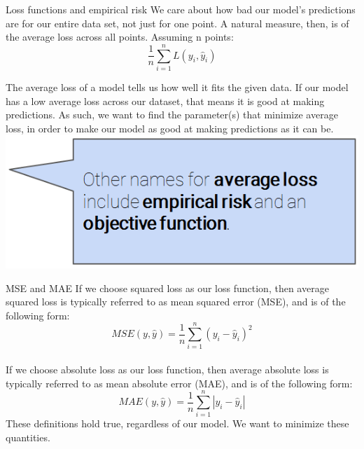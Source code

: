 \documentclass[aspectratio=169]{../latex_main/tntbeamer}  %
\begin{document}
	
	\begin{frame}{Loss functions and empirical risk}
	    We care about how bad our model’s predictions are for our entire data set, not just for one point. A natural measure, then, is of the average loss across all points.  Assuming   n   points:\\
	    \begin{equation*}
	        \frac{1}{n}\sum\limits_{i=1}^nL(y_i, \hat{y}_i)
	    \end{equation*}
	    
	    \bigskip
	    The average loss of a model tells us how well it fits the given data. If our model has a low average loss across our dataset, that means it is good at making predictions. As such, we want to find the parameter(s) that minimize average loss, in order to make our model as good at making predictions as it can be.\\
	    
        \vspace{-3.5cm}
        \hspace{8.5cm}
        \includegraphics[scale=.3]{Bild22}
	    
	\end{frame}
	
	
	\begin{frame}{MSE and MAE}
	    If we choose squared loss as our loss function, then average squared loss is typically referred to as mean squared error (MSE), and is of the following form: 
	    \begin{equation*}
	        MSE(y, \hat{y}) = \frac{1}{n}\sum\limits_{i=1}^n(y_i - \hat{y}_i)^2
	    \end{equation*}
	    \bigskip\\
	    If we choose absolute loss as our loss function, then average absolute loss is typically referred to as mean absolute error (MAE), and is of the following form:
	    \begin{equation*}
	        MAE(y, \hat{y}) = \frac{1}{n}\sum\limits_{i=1}^n|y_i - \hat{y}_i|
	    \end{equation*}
	    These definitions hold true, regardless of our model. We want to minimize these quantities.
	   
	\end{frame}
	
\end{document}
